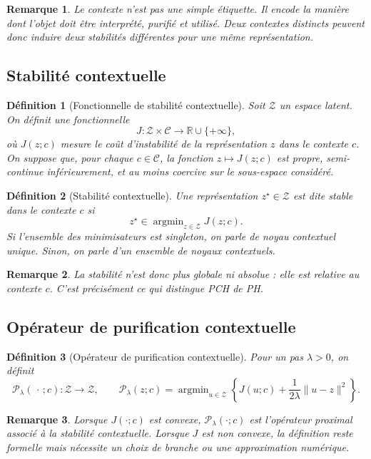 \documentclass[11pt,a4paper]{article}
\newtheorem{definition}{Définition}[section]
\newtheorem{remark}{Remarque}[section]
\DeclareMathOperator{\argmin}{argmin}
\newcommand{\C}{\mathcal C}
\newcommand{\Z}{\mathcal Z}
\newcommand{\R}{\mathbb R}
\newcommand{\Pcal}{\mathcal P}
\newcommand{\1}{\mathbf 1}
\begin{document}
\begin{remark}
Le contexte n'est pas une simple étiquette. Il encode la manière dont l'objet doit être interprété, purifié et utilisé.
Deux contextes distincts peuvent donc induire deux stabilités différentes pour une même représentation.
\end{remark}

\subsection{Stabilité contextuelle}

\begin{definition}[Fonctionnelle de stabilité contextuelle]
Soit \(\Z\) un espace latent.
On définit une fonctionnelle
\[
J:\Z\times\C\to\R\cup\{+\infty\},
\]
où \(J(z;c)\) mesure le coût d'instabilité de la représentation \(z\) dans le contexte \(c\).
On suppose que, pour chaque \(c\in\C\), la fonction \(z\mapsto J(z;c)\) est propre, semi-continue inférieurement, et au moins coercive sur le sous-espace considéré.
\end{definition}

\begin{definition}[Stabilité contextuelle]
Une représentation \(z^\star\in\Z\) est dite \emph{stable dans le contexte \(c\)} si
\[
z^\star\in\argmin_{z\in\Z} J(z;c).
\]
Si l'ensemble des minimisateurs est singleton, on parle de \emph{noyau contextuel unique}.
Sinon, on parle d'un \emph{ensemble de noyaux contextuels}.
\end{definition}

\begin{remark}
La stabilité n'est donc plus globale ni absolue : elle est relative au contexte \(c\).
C'est précisément ce qui distingue PCH de PH.
\end{remark}

\subsection{Opérateur de purification contextuelle}

\begin{definition}[Opérateur de purification contextuelle]
Pour un pas \(\lambda>0\), on définit
\[
\Pcal_{\lambda}(\,\cdot\,;c):\Z\to\Z,
\qquad
\Pcal_{\lambda}(z;c)
=
\argmin_{u\in\Z}
\left\{
J(u;c)
+
\frac{1}{2\lambda}\|u-z\|^2
\right\}.
\]
\end{definition}

\begin{remark}
Lorsque \(J(\cdot;c)\) est convexe, \(\Pcal_{\lambda}(\cdot;c)\) est l'opérateur proximal associé à la stabilité contextuelle.
Lorsque \(J\) est non convexe, la définition reste formelle mais nécessite un choix de branche ou une approximation numérique.
\end{remark}
\end{document}
